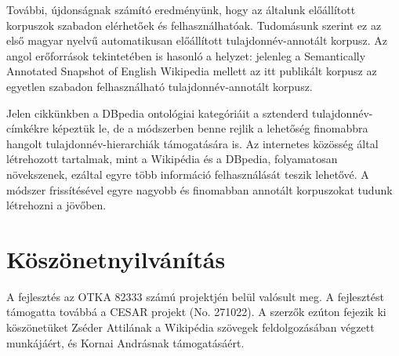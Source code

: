 \documentclass{llncs}
\begin{document}
További, újdonságnak számító eredményünk, hogy az általunk előállított korpuszok szabadon elérhetőek és felhasználhatóak. Tudomásunk szerint ez az első magyar nyelvű automatikusan előállított tulajdonnév-annotált korpusz. Az angol erőforrások tekintetében is hasonló a helyzet: jelenleg a Semantically Annotated Snapshot of English Wikipedia mellett az itt publikált korpusz az egyetlen szabadon felhasználható tulajdonnév-annotált korpusz. 

Jelen cikkünkben a DBpedia ontológiai kategóriáit a sztenderd tulajdonnév-címkékre képeztük le, de a módszerben benne rejlik a lehetőség finomabbra hangolt tulajdonnév-hierarchiák támogatására is. Az internetes közösség által létrehozott tartalmak, mint a Wikipédia és a DBpedia, folyamatosan növekszenek, ezáltal egyre több információ felhasználását teszik lehetővé. A módszer frissítésével egyre nagyobb és finomabban annotált korpuszokat tudunk létrehozni a jövőben.  

\section*{Köszönetnyilvánítás}
A fejlesztés az OTKA 82333 számú projektjén belül valósult meg. A fejlesztést támogatta továbbá a CESAR projekt (No. 271022). A szerzők ezúton fejezik ki köszönetüket Zséder Attilának a Wikipédia szövegek feldolgozásában végzett munkájáért, és Kornai Andrásnak támogatásáért. %



\end{document}
